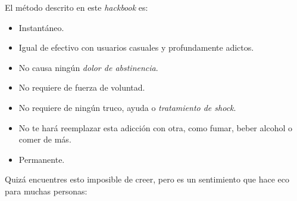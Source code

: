 \documentclass[
  spanish,
  openany]{book}
\providecommand{\tightlist}{%
  \setlength{\itemsep}{0pt}\setlength{\parskip}{0pt}}
\begin{document}
El método descrito en este \emph{hackbook} es:

\begin{itemize}
\tightlist
\item
  Instantáneo.
\item
  Igual de efectivo con usuarios casuales y profundamente adictos.
\item
  No causa ningún \emph{dolor de abstinencia}.
\item
  No requiere de fuerza de voluntad.
\item
  No requiere de ningún truco, ayuda o \emph{tratamiento de shock}.
\item
  No te hará reemplazar esta adicción con otra, como fumar, beber alcohol o comer de más.
\item
  Permanente.
\end{itemize}

Quizá encuentres esto imposible de creer, pero es un sentimiento que hace eco para muchas personas:
\end{document}

